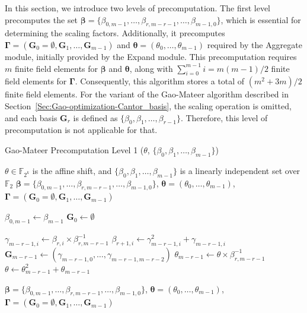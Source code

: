 In this section, we introduce two levels of precomputation. The first level precomputes the set $\boldsymbol{\beta} = \{\beta_{0, m-1}, \ldots, \beta_{r, m-r-1}, \ldots, \beta_{m-1, 0} \}$, which is essential for determining the scaling factors. Additionally, it precomputes  $\boldsymbol{\Gamma} = (\mathbf{G}_0 = \emptyset, \mathbf{G}_1,  \ldots, \mathbf{G}_{m-1})$ and $\boldsymbol{\theta} = (\theta_0, \ldots, \theta_{m-1})$ required by the \textsf{Aggregate} module, initially provided by the \textsf{Expand} module. This precomputation requires $m$ finite field elements for $\boldsymbol{\beta}$ and $\boldsymbol{\theta}$, along with $\sum_{i=0}^{m-1} i = m(m-1)/2$ finite field elements for $\boldsymbol{\Gamma}$. Consequently, this algorithm stores a total of $(m^2+3m)/2$  finite field elements. 
For the  variant of the Gao-Mateer algorithm described in Section~\ref{Sec:Gao-optimization-Cantor_basis}, the scaling operation is omitted, and each basis $\mathbf{G}_r$ is defined as $\{\beta_0, \beta_1, \ldots, \beta_{r-1}\}$. Therefore, this level of precomputation is not applicable for that.

\begin{algorithm}[htb]
	\caption{\small Gao-Mateer Precomputation Level 1 ($\theta$, $\{\beta_0, \beta_1, \ldots, \beta_{m-1}\}$)}
	\label{Algo:Gao_Precmp_lvl1}
	\begin{algorithmic}[1]
		\Require $\theta \in \mathbb{F}_{2^k}$ is the affine shift, and $\{\beta_0, \beta_1, \ldots, \beta_{m-1}\}$ is a linearly independent set over $\mathbb{F}_2$
		\Ensure $\boldsymbol{\beta} = \{\beta_{0, m-1}, \ldots, \beta_{r, m-r-1}, \ldots, \beta_{m-1, 0} \}$,  
		$\boldsymbol{\theta} = (\theta_0, \ldots, \theta_{m-1})$,  
		$\boldsymbol{\Gamma} = (\mathbf{G}_0 = \emptyset, \mathbf{G}_1, \ldots, \mathbf{G}_{m-1})$
		
		\State $\beta_{0, m-1} \gets \beta_{m-1}$
		\State $\mathbf{G}_0 \gets \emptyset$
		
		\State $\gamma_{m - r - 1, i} \gets \beta_{r, i} \times \beta_{r, m - r - 1}^{-1}$
		\State $\beta_{r + 1, i} \gets \gamma_{m - r - 1, i}^2 + \gamma_{m - r - 1, i}$
		\EndFor
		\State $\mathbf{G}_{m - r - 1} \gets (\gamma_{m - r - 1, 0}, \ldots, \gamma_{m - r - 1, m - r - 2})$
		\State $\theta_{m - r - 1} \gets \theta \times \beta_{r, m - r - 1}^{-1}$
		\State $\theta \gets \theta_{m - r - 1}^2 + \theta_{m - r - 1}$
		\EndFor
		
		\State \Return $\boldsymbol{\beta} = \{\beta_{0, m-1}, \ldots, \beta_{r, m-r-1}, \ldots, \beta_{m-1, 0} \}$,  
		$\boldsymbol{\theta} = (\theta_0, \ldots, \theta_{m-1})$,  
		$\boldsymbol{\Gamma} = (\mathbf{G}_0 = \emptyset, \mathbf{G}_1, \ldots, \mathbf{G}_{m-1})$
	\end{algorithmic}
\end{algorithm}


